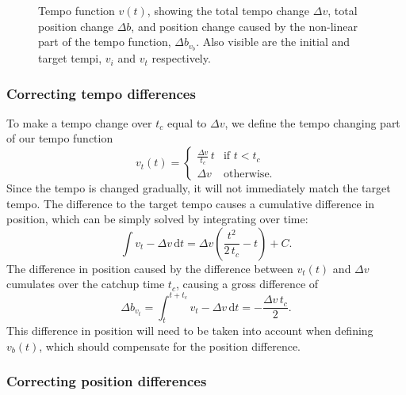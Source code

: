 \begin{figure}
\begin{center}

%
\caption{
Tempo function $v(t)$,
showing the total tempo change $\Delta v$,
total position change $\Delta b$,
and position change caused by the non-linear
part of the tempo function, $\Delta b_{v_b}$.
Also visible are the initial and target tempi,
$v_i$ and $v_t$ respectively.
}
\label{fig:tempo_function}
\end{center}
\end{figure}

\subsubsection*{Correcting tempo differences}

To make a tempo change
over $t_c$ equal to $\Delta v$,
we define the tempo changing part of our tempo function
\begin{equation}
\label{eq:tempo_function_tempo_correction}
v_t(t) =
\begin{cases}
\frac{\Delta v}{t_c} \, t & \text{if } t < t_c \\
\Delta v & \text{otherwise}.
\end{cases}
\end{equation}
Since the tempo is changed gradually,
it will not immediately match the target tempo.
The difference to the target tempo causes
a cumulative difference in position,
which can be simply solved by integrating over time:
\begin{equation}
\label{eq:linear_tempo_change_pos_diff}
\int v_t - \Delta v \, \mathrm{d}t =
\Delta v \left( \frac{t^2}{2 \, t_c} - t \right) + C.
\end{equation}
The difference in position
caused by the difference between $v_t(t)$ and $\Delta v$
cumulates over the catchup time $t_c$,
causing a gross difference of
\begin{equation}
\Delta b_{v_t} =
\int_t^{t + t_c} v_t - \Delta v \, \mathrm{d}t =
-\frac{\Delta v \, t_c }{2}.
\end{equation}
This difference in position will need to be taken into account
when defining $v_b(t)$,
which should compensate for the position difference.

\subsubsection*{Correcting position differences}

